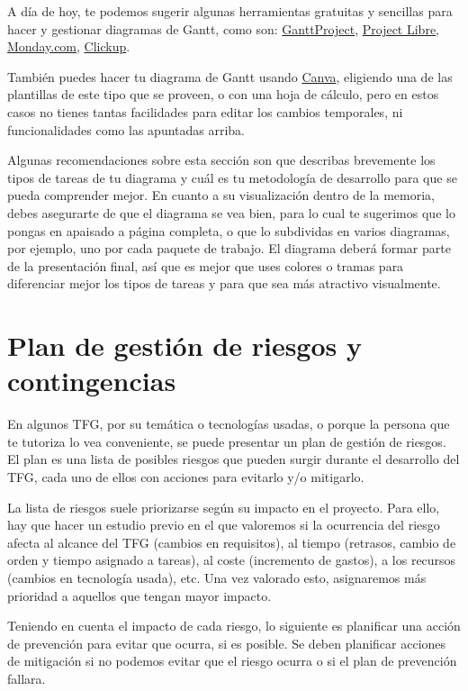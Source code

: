 A día de hoy, te podemos sugerir algunas herramientas gratuitas y sencillas para hacer y gestionar diagramas de Gantt, como son: \href{https://www.ganttproject.biz/}{GanttProject}, \href{https://www.projectlibre.com/}{Project Libre}, 
 \href{https://www.monday.com}{Monday.com}, \href{https://app.clickup.com/https://www.projectlibre.com/}{Clickup}. 

También puedes hacer tu diagrama de Gantt usando \href{https://www.canva.com/}{Canva}, eligiendo una de las plantillas de este tipo que se proveen, o con una hoja de cálculo, pero en estos casos no tienes tantas facilidades para editar los cambios temporales, ni funcionalidades como las apuntadas arriba.

Algunas recomendaciones sobre esta sección son que describas brevemente los tipos de tareas de tu diagrama y cuál es tu metodología de desarrollo para que se pueda comprender mejor. En cuanto a su visualización dentro de la memoria, debes asegurarte de que el diagrama se vea bien, para lo cual te sugerimos que lo pongas en apaisado a página completa, o que lo subdividas en varios diagramas, por ejemplo, uno por cada paquete de trabajo. El diagrama deberá formar parte de la presentación final, así que es mejor que uses colores o tramas para diferenciar mejor los tipos de tareas y para que sea más atractivo visualmente. 

\section{Plan de gestión de riesgos y contingencias}

En algunos TFG, por su temática o tecnologías usadas, o porque la persona que te tutoriza lo vea conveniente, se puede presentar un plan de gestión de riesgos. El plan es una lista de posibles riesgos que pueden surgir durante el desarrollo del TFG, cada uno de ellos con acciones para evitarlo y/o mitigarlo.


La lista de riesgos suele priorizarse según su impacto en el proyecto. Para ello, hay que hacer un estudio previo en el que valoremos si la ocurrencia del riesgo afecta al alcance del TFG (cambios en requisitos), al tiempo (retrasos, cambio de orden y tiempo asignado a tareas), al coste (incremento de gastos), a los recursos (cambios en tecnología usada), etc. Una vez valorado esto, asignaremos más prioridad a aquellos que tengan mayor impacto. 

Teniendo en cuenta el impacto de cada riesgo, lo siguiente es planificar una acción de prevención para evitar que ocurra, si es posible. Se deben planificar acciones de mitigación si no podemos evitar que el riesgo ocurra o si el plan de prevención fallara.

